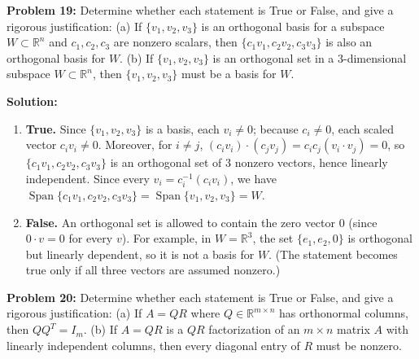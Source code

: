 \documentclass[11pt, letterpaper]{article}
\theoremstyle{definition}
\theoremstyle{remark}
\begin{document}
\textbf{Problem 19:} Determine whether each statement is True or False, and give a rigorous justification:
(a) If $\{v_1, v_2, v_3\}$ is an orthogonal basis for a subspace $W \subset \mathbb{R}^n$ and $c_1, c_2, c_3$ are nonzero scalars, then $\{c_1 v_1, c_2 v_2, c_3 v_3\}$ is also an orthogonal basis for $W$.
(b) If $\{v_1, v_2, v_3\}$ is an orthogonal set in a $3$-dimensional subspace $W \subset \mathbb{R}^n$, then $\{v_1, v_2, v_3\}$ must be a basis for $W$.

\textbf{Solution:}
\begin{enumerate}[label=(\alph*)]
    \item \textbf{True.} Since $\{v_1, v_2, v_3\}$ is a basis, each $v_i \neq 0$; because $c_i \neq 0$, each scaled vector $c_i v_i \neq 0$. Moreover, for $i \neq j$, $(c_i v_i) \cdot (c_j v_j) = c_i c_j (v_i \cdot v_j) = 0$, so $\{c_1 v_1, c_2 v_2, c_3 v_3\}$ is an orthogonal set of $3$ nonzero vectors, hence linearly independent. Since every $v_i = c_i^{-1}(c_i v_i)$, we have $\operatorname{Span}\{c_1 v_1, c_2 v_2, c_3 v_3\} = \operatorname{Span}\{v_1, v_2, v_3\} = W$.
    \item \textbf{False.} An orthogonal set is allowed to contain the zero vector $0$ (since $0 \cdot v = 0$ for every $v$). For example, in $W = \mathbb{R}^3$, the set $\{e_1, e_2, 0\}$ is orthogonal but linearly dependent, so it is not a basis for $W$. (The statement becomes true only if all three vectors are assumed nonzero.)
\end{enumerate}

\vspace{0.8em}

\textbf{Problem 20:} Determine whether each statement is True or False, and give a rigorous justification:
(a) If $A = QR$ where $Q \in \mathbb{R}^{m \times n}$ has orthonormal columns, then $Q Q^T = I_m$.
(b) If $A = QR$ is a $QR$ factorization of an $m \times n$ matrix $A$ with linearly independent columns, then every diagonal entry of $R$ must be nonzero.
\end{document}
